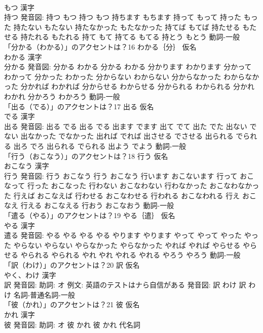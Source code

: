 \documentclass[8pt]{extreport}
\begin{document}
\begin{CJK}{UTF8}{min}
\\	もつ 漢字　
\\	持つ 発音図:	持つ もつ		持つ もつ 持ちます もちます 持って もって 持った もった 持たない もたない 持たなかった もたなかった 持てば もてば 持たせる もたせる 持たれる もたれる 持て もて 持てる もてる 持とう もとう				動詞-一般 
\\	「分かる（わかる）」のアクセントは？16	わかる｛分｝ 仮名　
\\	わかる 漢字　
\\	分かる 発音図:	分かる わかる		分かる わかる 分かります わかります 分かって わかって 分かった わかった 分からない わからない 分からなかった わからなかった 分かれば わかれば 分からせる わからせる 分かられる わかられる 分かれ わかれ 分かろう わかろう				動詞-一般 
\\	「出る（でる）」のアクセントは？17	出る 仮名　
\\	でる 漢字　
\\	出る 発音図:	出る でる		出る でる 出ます でます 出て でて 出た でた 出ない でない 出なかった でなかった 出れば でれば 出させる でさせる 出られる でられる 出ろ でろ 出られる でられる 出よう でよう				動詞-一般 
\\	「行う（おこなう）」のアクセントは？18	行う 仮名　
\\	おこなう 漢字　
\\	行う 発音図:	行う おこなう		行う おこなう 行います おこないます 行って おこなって 行った おこなった 行わない おこなわない 行わなかった おこなわなかった 行えば おこなえば 行わせる おこなわせる 行われる おこなわれる 行え おこなえ 行える おこなえる 行おう おこなおう				動詞-一般 
\\	「遣る（やる）」のアクセントは？19	やる｛遣｝ 仮名　
\\	やる 漢字　
\\	遣る 発音図:	やる やる		やる やる やります やります やって やって やった やった やらない やらない やらなかった やらなかった やれば やれば やらせる やらせる やられる やられる やれ やれ やれる やれる やろう やろう				動詞-一般 
\\	「訳（わけ）」のアクセントは？20	訳 仮名　
\\	やく、わけ 漢字　
\\	訳 発音図: 助詞: オ 例文: 英語のテストはナら自信がある 発音図:	訳 わけ		訳 わけ				名詞-普通名詞-一般 
\\	「彼（かれ）」のアクセントは？21	彼 仮名　
\\	かれ 漢字　
\\	彼 発音図: 助詞: オ	彼 かれ		彼 かれ				代名詞 

\end{CJK}
\end{document}
